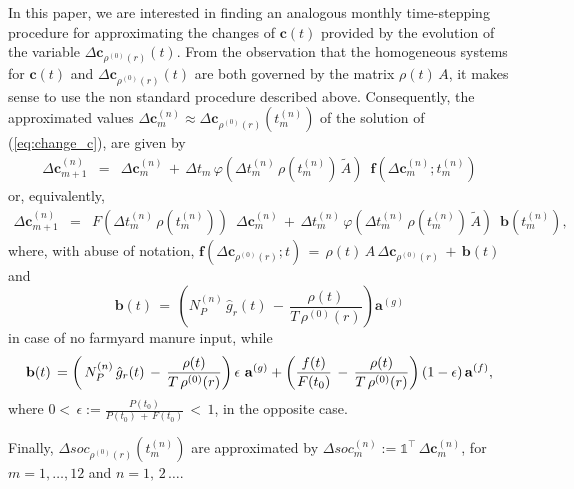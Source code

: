 \noindent In this paper, we are interested in finding an analogous monthly time-stepping procedure for approximating the changes of $\mathbf{c}(t)$ provided by the evolution of the variable $\Delta \mathbf{c}_{\rho^{(0)}(r)}(t)$. From the observation that the homogeneous systems for  $\mathbf{c}(t)$ and $\Delta \mathbf{c}_{\rho^{(0)}(r)}(t)$ are both governed by the matrix $\rho(t) \, A$, it makes sense to use the non standard procedure described above. Consequently, the approximated values $\Delta \mathbf{c}_{m}^{(n)}  \approx \Delta \mathbf{c}_{\rho^{(0)}(r)}(t_{m}^{(n)})$ of the solution of (\ref{eq:change_c}), are given by \begin{equation}\label{eq:change_c_approx_first}
 \begin{array}{lll}
 \Delta \mathbf{c}^{(n)}_{m+1}& =& \Delta \mathbf{c}^{(n)}_{m}\,+\, \Delta t_m \,\varphi(\Delta t^{(n)}_m \,\rho({t_{m}^{(n)}})\, \widetilde A) \,\,\, \mathbf{f}( \Delta  \mathbf{c}^{(n)}_{m}; t^{(n)}_m)  \end{array}
\end{equation}
 or, equivalently, 
\begin{equation}\label{eq:change_c_approx_second}
 \begin{array}{lll}
 \Delta \mathbf{c}^{(n)}_{m+1} &=& F(\Delta t^{(n)}_m\,\rho(t^{(n)}_{m}))\,\,\, \Delta \mathbf{c}^{(n)}_m \,+\, \Delta t^{(n)}_m \,\varphi(\Delta t^{(n)}_m\,\rho(t^{(n)}_{m})\, \widetilde A ) \,\,\, \mathbf{b}(t^{(n)}_{m}),
 \end{array}
\end{equation}
where, with abuse of notation, $\mathbf{f}( \Delta \mathbf{c}_{\rho^{(0)}(r)}; t)\, =\,   \rho(t) \, A\, \Delta \mathbf{c}_{\rho^{(0)}(r)}\, +\, \mathbf{b}(t) $ and 
$$
 \mathbf{b}(t)\, = \, \left( N_P^{(n)} \,  \hat g_r(t)\,-\, \displaystyle \frac{\rho(t)}{T\,\rho^{(0)}(r)}  \right) \mathbf{a}^{(g)}
$$
in case of no farmyard manure input, while 
$$
 \mathbf{b}(t)\, = 
\left(  \, N_P^{(n)} \, \hat g_r(t) \,-\, \displaystyle \frac{\rho(t)}{T\, \rho^{(0)}(r)}  \right) \epsilon\,  \, \mathbf{a}^{(g)} \\\\
    + \left( \displaystyle \frac{f(t)}{F(t_0)}  \,-\,  \displaystyle \frac{\rho(t) }{T\, \rho^{(0)}(r)} \right) (1-\epsilon)\, \mathbf{a}^{(f)}, 
$$
where $0<\,\epsilon:= \displaystyle \frac{P(t_0)}{P(t_0)\,+\,F(t_0)}\, < \, 1$,  in the opposite case.

\noindent Finally, $\Delta soc_{\rho^{(0)}(r)}(t^{(n)}_{m})$ are approximated by  $  \Delta soc^{(n)}_{m}:= \mathds{1}^\intercal  \,  \Delta \mathbf{c}^{(n)}_{m} $, for $m = 1,\dots, 12$ and $n=1,\, 2\, \dots$. 


